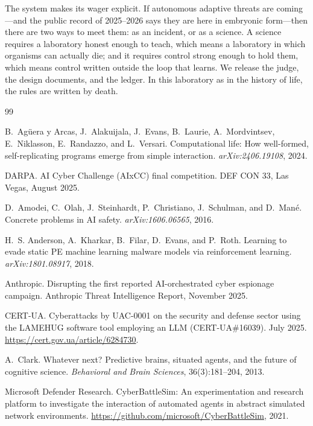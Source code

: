 \documentclass[11pt,a4paper]{article}
\begin{document}
The system makes its wager explicit. If autonomous adaptive threats are coming---and the public record of 2025--2026 says they are here in embryonic form---then there are two ways to meet them: as an incident, or as a science. A science requires a laboratory honest enough to teach, which means a laboratory in which organisms can actually die; and it requires control strong enough to hold them, which means control written outside the loop that learns. We release the judge, the design documents, and the ledger. In this laboratory as in the history of life, the rules are written by death.

\begin{thebibliography}{99}
\scriptsize

B.~Ag{\"u}era y Arcas, J.~Alakuijala, J.~Evans, B.~Laurie, A.~Mordvintsev, E.~Niklasson, E.~Randazzo, and L.~Versari.
Computational life: How well-formed, self-replicating programs emerge from simple interaction.
\emph{arXiv:2406.19108}, 2024.

DARPA.
AI Cyber Challenge (AIxCC) final competition.
DEF CON 33, Las Vegas, August 2025.

D.~Amodei, C.~Olah, J.~Steinhardt, P.~Christiano, J.~Schulman, and D.~Man{\'e}.
Concrete problems in AI safety.
\emph{arXiv:1606.06565}, 2016.

H.~S. Anderson, A.~Kharkar, B.~Filar, D.~Evans, and P.~Roth.
Learning to evade static PE machine learning malware models via reinforcement learning.
\emph{arXiv:1801.08917}, 2018.

Anthropic.
Disrupting the first reported AI-orchestrated cyber espionage campaign.
Anthropic Threat Intelligence Report, November 2025.

CERT-UA.
Cyberattacks by UAC-0001 on the security and defense sector using the LAMEHUG software tool employing an LLM (CERT-UA\#16039).
July 2025. \url{https://cert.gov.ua/article/6284730}.

A.~Clark.
Whatever next? Predictive brains, situated agents, and the future of cognitive science.
\emph{Behavioral and Brain Sciences}, 36(3):181--204, 2013.

Microsoft Defender Research.
CyberBattleSim: An experimentation and research platform to investigate the interaction of automated agents in abstract simulated network environments.
\url{https://github.com/microsoft/CyberBattleSim}, 2021.


\end{thebibliography}
\end{document}
